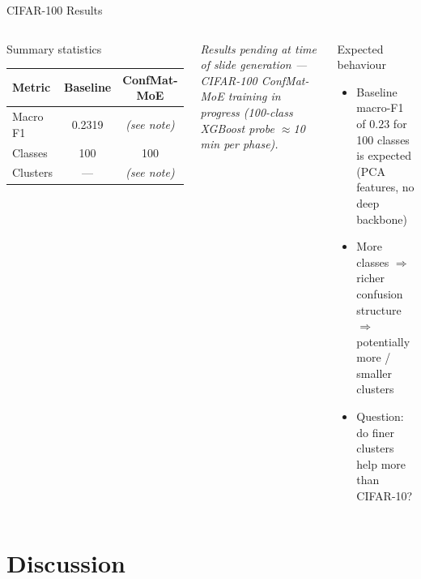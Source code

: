 \documentclass[aspectratio=169,10pt]{beamer}
\begin{document}
\begin{frame}{CIFAR-100 Results}
  \begin{columns}[T]
      \begin{block}{Summary statistics}
        \small
        \renewcommand{\arraystretch}{1.3}
        \begin{tabular}{lcc}
          \toprule
          \textbf{Metric} & \textbf{Baseline} & \textbf{ConfMat-MoE} \\
          \midrule
          Macro F1   & 0.2319 & \textit{(see note)} \\
          Classes    & 100    & 100 \\
          Clusters   & ---    & \textit{(see note)} \\
          \bottomrule
        \end{tabular}
      \end{block}
      \vspace{6pt}
      {\small \textit{Results pending at time of slide generation ---
      CIFAR-100 ConfMat-MoE training in progress (100-class XGBoost probe
      $\approx$10 min per phase).}}
      \begin{block}{Expected behaviour}
        \small
        \begin{itemize}\itemsep4pt
          \item Baseline macro-F1 of $0.23$ for 100 classes
                is expected (PCA features, no deep backbone)
          \item More classes $\Rightarrow$ richer confusion structure
                $\Rightarrow$ potentially more / smaller clusters
          \item Question: do finer clusters help more than CIFAR-10?
        \end{itemize}
      \end{block}
  \end{columns}
\end{frame}

\section{Discussion}
\end{document}
